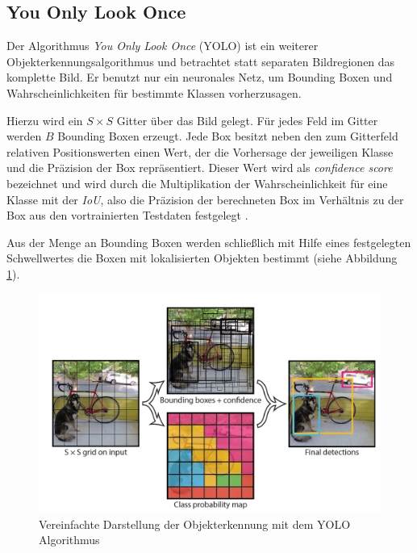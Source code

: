 \subsection{You Only Look Once}

Der Algorithmus \textit{You Only Look Once} (YOLO) ist ein weiterer Objekterkennungsalgorithmus und betrachtet statt separaten Bildregionen das komplette Bild. Er benutzt nur ein neuronales Netz, um Bounding Boxen und Wahrscheinlichkeiten für bestimmte Klassen vorherzusagen.

Hierzu wird ein $S \times S$ Gitter über das Bild gelegt. Für jedes Feld im Gitter werden $B$ Bounding Boxen erzeugt. Jede Box besitzt neben den zum Gitterfeld relativen Positionswerten einen Wert, der die Vorhersage der jeweiligen Klasse und die Präzision der Box repräsentiert. Dieser Wert wird als \textit{confidence score} bezeichnet und wird durch die Multiplikation der Wahrscheinlichkeit für eine Klasse mit der \textit{IoU}, also die Präzision der berechneten Box im Verhältnis zu der Box aus den vortrainierten Testdaten festgelegt \cite{JosephRedmon.2016}.

Aus der Menge an Bounding Boxen werden schließlich mit Hilfe eines festgelegten Schwellwertes die Boxen mit lokalisierten Objekten bestimmt (siehe Abbildung \ref{yolo_model}).

\begin{figure}[ht]
	\begin{center}
		\includegraphics[width=15cm]{Bilder/yolo_model.png} 
		\caption{Vereinfachte Darstellung der Objekterkennung mit dem YOLO Algorithmus \cite{JosephRedmon.2016}}
		\label{yolo_model}
	\end{center}
\end{figure}

